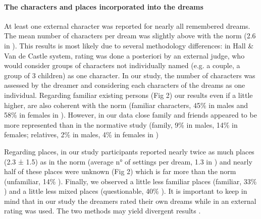 \paragraph{The characters and places incorporated into the dreams}

At least one external character was reported for nearly all remembered dreams. The mean number of characters per dream was slightly above with the norm (2.6 in \citealp{hall_content_1966}). This results is most likely due to several methodology differences: in Hall \& Van de Castle system, rating was done a posteriori by an external judge, who would consider groups of characters not individually named (e.g. a couple, a group of 3 children) as one character. In our study, the number of characters was assessed by the dreamer and considering each characters of the dreams as one individual. Regarding familiar existing persons (Fig 2) our results even if a little higher, are also coherent with the norm (familiar characters, 45\% in males and 58\% in females in \citealp{hall_content_1966}). However, in our data close family and friends appeared to be more represented than in the normative study (family, 9\% in males, 14\% in females; relatives, 2\% in males, 4\% in females in \citealp{hall_content_1966})

Regarding places, in our study participants reported nearly twice as much places (2.3 ± 1.5) as in the norm (average n° of settings per dream, 1.3 in \citealp{hall_content_1966}) and nearly half of these places were unknown (Fig 2) which is far more than the norm (unfamiliar, 14\% \citealp{hall_content_1966}). Finally, we observed a little less familiar places (familiar, 33\% \citealp{hall_content_1966}) and a little less mixed places (questionable, 40\% \citealp{hall_content_1966}). It is important to keep in mind that in our study the dreamers rated their own dreams while in \citet{hall_content_1966} an external rating was used. The two methods may yield divergent results \citep{sikka_i_2014}.
